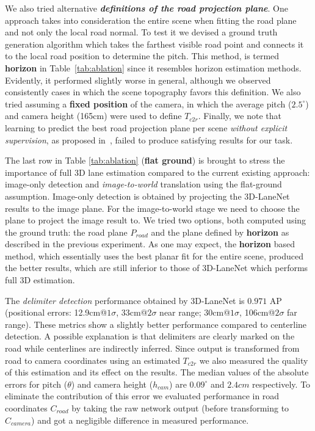 \documentclass[10pt,twocolumn,letterpaper]{article}
\begin{document}
We also tried alternative \textit{\textbf{definitions of the road projection plane}}. One approach takes into consideration the entire scene when fitting the road plane and not only the local road normal. To test it we devised a ground truth generation algorithm which takes the farthest visible road point and connects it to the local road position to determine the pitch. This method, is termed \textbf{horizon} in Table~\ref{tab:ablation} since it resembles horizon estimation methods. Evidently, it performed slightly worse in general, although we observed consistently cases in which the scene topography favors this definition. We also tried assuming a \textbf{fixed position} of the camera, in which the average pitch ($2.5^\circ$) and camera height (165cm) were used to define $T_{c2r}$. Finally, we note that learning to predict the best road projection plane per scene \textit{without explicit supervision}, as proposed in~\cite{neven}, failed to produce satisfying results for our task. 

The last row in Table \ref{tab:ablation} (\textbf{flat ground}) is brought to stress the importance of full 3D lane estimation compared to the current existing approach: image-only detection and \textit{image-to-world} translation using the flat-ground assumption. Image-only detection is obtained by projecting the 3D-LaneNet results to the image plane. For the image-to-world stage we need to choose the plane to project the image result to. We tried two options, both computed using the ground truth: the road plane $P_{road}$ and the plane defined by \textbf{horizon} as described in the previous experiment. As one may expect, the \textbf{horizon} based method, which essentially uses the best planar fit for the entire scene, produced the better results, which are still inferior to those of 3D-LaneNet which performs full 3D estimation.



The \textit{delimiter detection} performance obtained by 3D-LaneNet is $0.971$ AP (positional errors: 12.9cm@$1\sigma$, 33cm@$2\sigma$ near range;  30cm@$1\sigma$, 106cm@$2\sigma$ far range). These metrics show a slightly better performance compared to centerline detection. A possible explanation is that delimiters are clearly marked on the road while centerlines are indirectly inferred. Since output is transformed from road to camera coordinates using an estimated $T_{c2r}$ we also measured the quality of this estimation and its effect on the results. The median values of the absolute errors for pitch ($\theta$) and camera height ($h_{cam}$) are $0.09^\circ$ and $2.4cm$ respectively. To eliminate the contribution of this error we evaluated performance in road coordinates $C_{road}$ by taking the raw network output (before transforming to $C_{camera}$) and got a negligible difference in measured performance.
\end{document}
